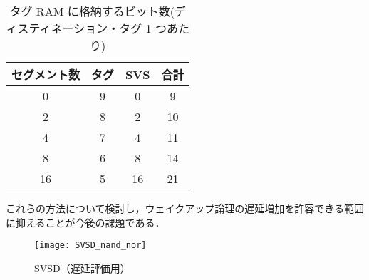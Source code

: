   \begin{table}[htb]
  \caption{タグ RAM に格納するビット数(ディスティネーション・タグ 1 つあたり)}
  \footnotesize
    \center
    \begin{tabular}{c|c|c|c} \hline \hline
       セグメント数 & タグ & SVS & 合計 \\ \hline
       0 & 9 & 0 & 9 \\ 
       2 & 8 & 2 & 10 \\ 
       4 & 7 & 4 & 11 \\ 
       8 & 6 & 8 & 14 \\ 
       16 & 5 & 16 & 21 \\ 
    \hline
  \end{tabular}
  \label{tab:tag_bit}
  \end{table}
  
  これらの方法について検討し，ウェイクアップ論理の遅延増加を許容できる範囲に抑えることが今後の課題である．
  
\begin{figure}[htb]
  \centering
  \texttt{[image: SVSD\_nand\_nor]}
  \caption{SVSD（遅延評価用）}
  \label{fig:SVSD_nand_nor}
\end{figure}
